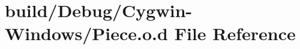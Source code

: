 \hypertarget{_cygwin-_windows_2_piece_8o_8d}{}\section{build/\+Debug/\+Cygwin-\/\+Windows/\+Piece.o.\+d File Reference}
\label{_cygwin-_windows_2_piece_8o_8d}
